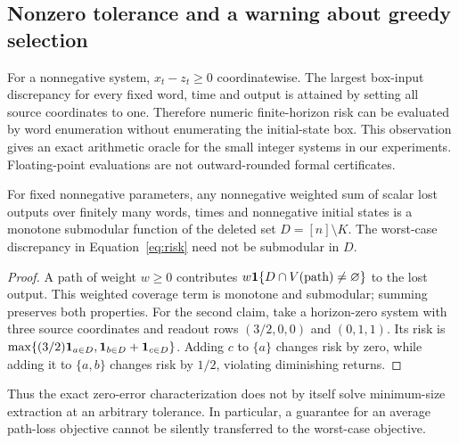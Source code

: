 \subsection{Nonzero tolerance and a warning about greedy selection}
For a nonnegative system, $x_t-z_t\ge0$ coordinatewise. The largest box-input discrepancy for every fixed word, time and output is attained by setting all source coordinates to one. Therefore numeric finite-horizon risk can be evaluated by word enumeration without enumerating the initial-state box. This observation gives an exact arithmetic oracle for the small integer systems in our experiments. Floating-point evaluations are not outward-rounded formal certificates.

\begin{proposition}\label{prop:coverage}
For fixed nonnegative parameters, any nonnegative weighted sum of scalar lost outputs over finitely many words, times and nonnegative initial states is a monotone submodular function of the deleted set $D=[n]\setminus K$. The worst-case discrepancy in Equation~\eqref{eq:risk} need not be submodular in $D$.
\end{proposition}
\begin{proof}
A path of weight $w\ge0$ contributes $w\mathbf 1\{D\cap V(\text{path})\ne\varnothing\}$ to the lost output. This weighted coverage term is monotone and submodular; summing preserves both properties. For the second claim, take a horizon-zero system with three source coordinates and readout rows $(3/2,0,0)$ and $(0,1,1)$. Its risk is
$\max\{(3/2)\mathbf 1_{a\in D},\mathbf 1_{b\in D}+\mathbf 1_{c\in D}\}$.
Adding $c$ to $\{a\}$ changes risk by zero, while adding it to $\{a,b\}$ changes risk by $1/2$, violating diminishing returns.
\end{proof}
Thus the exact zero-error characterization does not by itself solve minimum-size extraction at an arbitrary tolerance. In particular, a guarantee for an average path-loss objective cannot be silently transferred to the worst-case objective.


